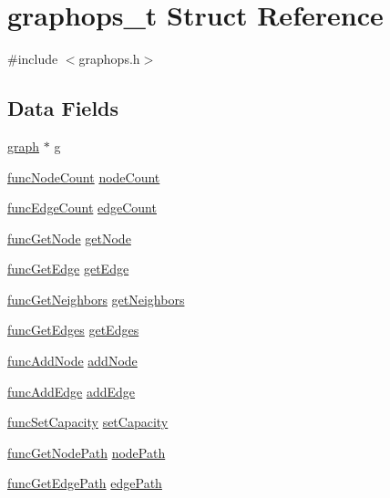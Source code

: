 \hypertarget{structgraphops__t}{}\section{graphops\+\_\+t Struct Reference}
\label{structgraphops__t}


{\ttfamily \#include $<$graphops.\+h$>$}

\subsection*{Data Fields}
\begin{DoxyCompactItemize}
\item 
\hyperlink{graphdata_8h_ad149912e738dca1c84b3b4508382fff5}{graph} $\ast$ \hyperlink{structgraphops__t_ab8a78cf4f0bdfe6a65aa217a716ca537}{g}
\item 
\hyperlink{graphops_8h_a5f1ba03cba8efec39224db7b6afc8374}{func\+Node\+Count} \hyperlink{structgraphops__t_a07801b43de87d48f426d7abf7959e738}{node\+Count}
\item 
\hyperlink{graphops_8h_a9c7f99c0f38ebae08cb49e70ffe91fa1}{func\+Edge\+Count} \hyperlink{structgraphops__t_a5db6e2eee59ada7705fb54bf5f6b9ee1}{edge\+Count}
\item 
\hyperlink{graphops_8h_ab5b794bee2b91f62033011c8e4c867ec}{func\+Get\+Node} \hyperlink{structgraphops__t_ab410442ef123fc79f1c8a431502e2a23}{get\+Node}
\item 
\hyperlink{graphops_8h_aed109d4861cfae4ea7721603770befca}{func\+Get\+Edge} \hyperlink{structgraphops__t_aafbe3ec7bdce040b86d7748c953cf607}{get\+Edge}
\item 
\hyperlink{graphops_8h_a201169542b84db39bcb68ae94223e773}{func\+Get\+Neighbors} \hyperlink{structgraphops__t_ac6c5bec2f102e4da5959cc3db66ac3c6}{get\+Neighbors}
\item 
\hyperlink{graphops_8h_af1e618623a0855f489ac957e5ae24ac0}{func\+Get\+Edges} \hyperlink{structgraphops__t_a87fec7e1150c05e54e34ab09fe401eaa}{get\+Edges}
\item 
\hyperlink{graphops_8h_ac3a2b8cb9dcf1f1a8cd4cb5f819e245a}{func\+Add\+Node} \hyperlink{structgraphops__t_aa1fdab76a86ab2889415964b51f1738f}{add\+Node}
\item 
\hyperlink{graphops_8h_a7db3802ca9110f9f9095250ed85a39a5}{func\+Add\+Edge} \hyperlink{structgraphops__t_af9a74b6643b49f7799dfa78f4824aa22}{add\+Edge}
\item 
\hyperlink{graphops_8h_a7f161b975929757de2684535b39d60bb}{func\+Set\+Capacity} \hyperlink{structgraphops__t_a6f05f8daf75bc380988e20e019681c0a}{set\+Capacity}
\item 
\hyperlink{graphops_8h_a43aa084c4514d1f3c2179551905aa655}{func\+Get\+Node\+Path} \hyperlink{structgraphops__t_afd2a0b194e922fa656b4352a8fed9e05}{node\+Path}
\item 
\hyperlink{graphops_8h_ac2b0381c5a4018e52104e27c57fb5c2c}{func\+Get\+Edge\+Path} \hyperlink{structgraphops__t_ab0fdace070db2a1fa199e920b6136a04}{edge\+Path}
\end{DoxyCompactItemize}


